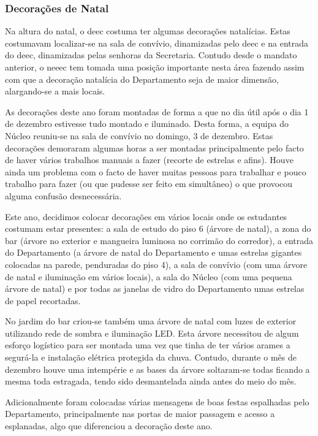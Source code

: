
\subsubsection{Decorações de Natal}

Na altura do natal, o \acrshort{deec} costuma ter algumas decorações natalícias. Estas costumavam localizar-se na sala de convívio, dinamizadas pelo \acrshort{deec} e na entrada do \acrshort{deec}, dinamizadas pelas senhoras da Secretaria. Contudo desde o mandato anterior, o \acrshort{neeec} tem tomada uma posição importante nesta área fazendo assim com que a decoração natalícia do Departamento seja de maior dimensão, alargando-se a mais locais.

As decorações deste ano foram montadas de forma a que no dia útil após o dia 1 de dezembro estivesse tudo montado e iluminado. Desta forma, a equipa do Núcleo reuniu-se na sala de convívio no domingo, 3 de dezembro. Estas decorações demoraram algumas horas a ser montadas principalmente pelo facto de haver vários trabalhos manuais a fazer (recorte de estrelas e afins). Houve ainda um problema com o facto de haver muitas pessoas para trabalhar e pouco trabalho para fazer (ou que pudesse ser feito em simultâneo) o que provocou alguma confusão desnecessária.

Este ano, decidimos colocar decorações em vários locais onde os estudantes costumam estar presentes: a sala de estudo do piso 6 (árvore de natal), a zona do bar (árvore no exterior e mangueira luminosa no corrimão do corredor), a entrada do Departamento (a árvore de natal do Departamento e umas estrelas gigantes colocadas na parede, penduradas do piso 4), a sala de convívio (com uma árvore de natal e iluminação em vários locais), a sala do Núcleo (com uma pequena árvore de natal) e por todas as janelas de vidro do Departamento umas estrelas de papel recortadas.

No jardim do bar criou-se também uma árvore de natal com luzes de exterior utilizando rede de sombra e iluminação LED. Esta árvore necessitou de algum esforço logístico para ser montada uma vez que tinha de ter vários arames a segurá-la e instalação elétrica protegida da chuva. Contudo, durante o mês de dezembro houve uma intempérie e as bases da árvore soltaram-se todas ficando a mesma toda estragada, tendo sido desmantelada ainda antes do meio do mês.

Adicionalmente foram colocadas várias mensagens de boas festas espalhadas pelo Departamento, principalmente nas portas de maior passagem e acesso a esplanadas, algo que diferenciou a decoração deste ano.

